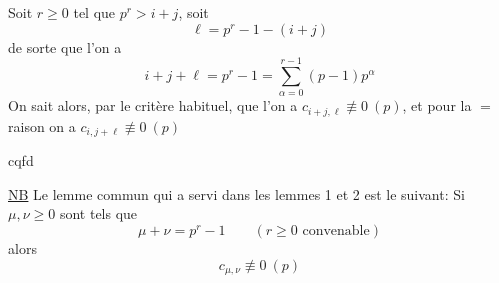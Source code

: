 
Soit $r\geq0$ tel que $p^r>i+j$, soit \deleted{$\unsure{\ell}$}
\[
\ell=p^r-1-(i+j)
\]
de sorte que l'on a
\[
i+j+\ell=p^r-1=\sum_{\alpha=0}^{r-1}(p-1)p^\alpha
\]
On sait alors, par le critère habituel, que l'on a $c_{i+j,\ell}\not\equiv0\ (p)$, et pour la $=$ raison on a $c_{i,j+\ell}\not\equiv0\ (p)$

cqfd

\uline{NB} Le lemme commun qui a servi dans les lemmes 1 et 2 est le suivant:
Si $\mu,\nu\geq0$ sont tels que
\[
\mu+\nu=p^r-1\qquad(r\geq0\text{ convenable})
\]
alors
\[
c_{\mu,\nu}\not\equiv0\ (p)
\]

